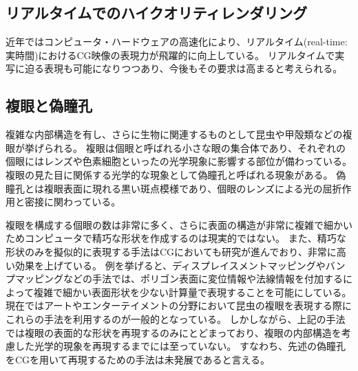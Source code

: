 
\subsection{リアルタイムでのハイクオリティレンダリング}

近年ではコンピュータ・ハードウェアの高速化により、リアルタイム(real-time:実時間)におけるCG映像の表現力が飛躍的に向上している。
リアルタイムで実写に迫る表現も可能になりつつあり、今後もその要求は高まると考えられる。


\subsection{複眼と偽瞳孔}
\label{SSCompoundeyeandpseudopupil}

複雑な内部構造を有し、さらに生物に関連するものとして昆虫や甲殻類などの複眼が挙げられる。
複眼は個眼と呼ばれる小さな眼の集合体であり、それぞれの個眼にはレンズや色素細胞といったの光学現象に影響する部位が備わっている。
複眼の見た目に関係する光学的な現象として偽瞳孔と呼ばれる現象がある。
偽瞳孔とは複眼表面に現れる黒い斑点模様であり、個眼のレンズによる光の屈折作用と密接に関わっている。

複眼を構成する個眼の数は非常に多く、さらに表面の構造が非常に複雑で細かいためコンピュータで精巧な形状を作成するのは現実的ではない。
また、精巧な形状のみを擬似的に表現する手法はCGにおいても研究が進んでおり、非常に高い効果を上げている。
例を挙げると、ディスプレイスメントマッピングやバンプマッピングなどの手法では、ポリゴン表面に変位情報や法線情報を付加するによって複雑で細かい表面形状を少ない計算量で表現することを可能にしている\figref{}\figref{}。
現在ではアートやエンターテイメントの分野において昆虫の複眼を表現する際にこれらの手法を利用するのが一般的となっている\figref{}。
しかしながら、上記の手法では複眼の表面的な形状を再現するのみにとどまっており、複眼の内部構造を考慮した光学的現象を再現するまでには至っていない。
すなわち、先述の偽瞳孔をCGを用いて再現するための手法は未発展であると言える。



